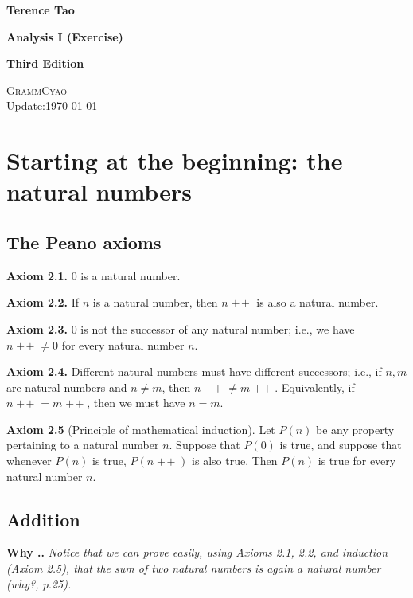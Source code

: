 \documentclass{book}
\DeclareMathOperator{\tadd}{+\!+}%
\newcommand{\titl}[1]{\noindent\textbf{#1}}
\newcounter{Exercise}[section]
\newcounter{Why}[section]
\renewcommand{\theWhy}{\thesection.\arabic{Why}.}
\newcommand{\neww}{\vspace{1.5em}\noindent\textbf{{Why \stepcounter{Why}\textbf{\theWhy}}} }
\begin{document}
\setlength{\headheight}{14pt}
\large
\setlength\parindent{2em}
\begin{titlepage}
   {\indent\LARGE\textbf{Terence Tao}}
   
   \vspace{6em}
   {\indent\fontsize{30pt}{0pt}\textbf{Analysis I (Exercise)}}

   \vspace{3em}
   {\indent\LARGE\textbf{Third Edition}}

   \vfill
   {\indent\small{\textsc{GrammCyao}}}\\
   {\indent\small{Update:\today}}
\end{titlepage}
\thispagestyle{empty}
\tableofcontents
\thispagestyle{empty}
\cleardoublepage
\setcounter{page}{1}
\setcounter{chapter}{1}

\chapter[The natural numbers]{Starting at the beginning: the natural numbers}
\section{The Peano axioms}

\titl{Axiom 2.1.} $0$ is a natural number.

\titl{Axiom 2.2.} If $n$ is a natural number, then $n\tadd$ is also a natural number.

\titl{Axiom 2.3.} $0$ is not the successor of any natural number; i.e., we have $n\tadd\neq 0$ for every natural number $n$.

\titl{Axiom 2.4.} Different natural numbers must have different successors; i.e., if $n, m$ are natural numbers and $n\neq m$, then $n\tadd\neq m\tadd$. Equivalently, if $n\tadd=m\tadd$, then we must have $n=m$.

\titl{Axiom 2.5} (Principle of mathematical induction). Let $P(n)$ be any property pertaining to a natural number $n$. Suppose that $P(0)$ is true, and suppose that whenever $P(n)$ is true, $P(n\tadd)$ is also true. Then $P(n)$ is true for every natural number $n$.

\section{Addition}

\neww\emph{Notice that we can prove easily, using Axioms 2.1, 2.2, and induction (Axiom 2.5), that the sum of two natural numbers is again a natural number (why?, p.25).}
\end{document}
